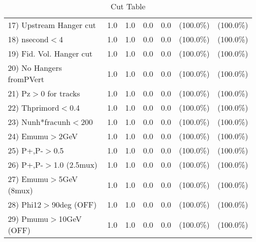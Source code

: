 \begin{table}[h!]
\begin{tabular}{||l||r|r|r|r|r|r||}
 17) Upstream Hanger cut  &          1.0 &          1.0 &          0.0 &          0.0 & (100.0\%) & (100.0\%) \\
 18) nsecond$<$4          &          1.0 &          1.0 &          0.0 &          0.0 & (100.0\%) & (100.0\%) \\
 19) Fid. Vol. Hanger cut &          1.0 &          1.0 &          0.0 &          0.0 & (100.0\%) & (100.0\%) \\
 20) No Hangers fromPVert &          1.0 &          1.0 &          0.0 &          0.0 & (100.0\%) & (100.0\%) \\
 21) Pz$>$0 for tracks    &          1.0 &          1.0 &          0.0 &          0.0 & (100.0\%) & (100.0\%) \\
 22) Thprimord$<$0.4      &          1.0 &          1.0 &          0.0 &          0.0 & (100.0\%) & (100.0\%) \\
 23) Nunh*fracunh$<$200   &          1.0 &          1.0 &          0.0 &          0.0 & (100.0\%) & (100.0\%) \\
 24) Emumu$>$2GeV         &          1.0 &          1.0 &          0.0 &          0.0 & (100.0\%) & (100.0\%) \\
 25) P+,P-$>$0.5          &          1.0 &          1.0 &          0.0 &          0.0 & (100.0\%) & (100.0\%) \\
 26) P+,P-$>$1.0 (2.5mux) &          1.0 &          1.0 &          0.0 &          0.0 & (100.0\%) & (100.0\%) \\
 27) Emumu$>$5GeV  (8mux) &          1.0 &          1.0 &          0.0 &          0.0 & (100.0\%) & (100.0\%) \\
 28) Phi12$>$90deg  (OFF) &          1.0 &          1.0 &          0.0 &          0.0 & (100.0\%) & (100.0\%) \\
 29) Pmumu$>$10GeV  (OFF) &          1.0 &          1.0 &          0.0 &          0.0 & (100.0\%) & (100.0\%) \\
 \hline
 \hline
 \end{tabular}
 \caption{Cut Table           }
 \label{tab-cutcohjpsi-mumu_cohrho0}
 \end{table}
